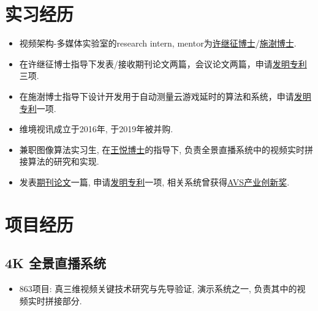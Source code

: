 \documentclass{resume}
\begin{document}
\section{实习经历}
\begin{itemize}
   \item 视频架构-多媒体实验室的research intern, mentor为\href{https://scholar.google.com/citations?user=x4iWZ7wAAAAJ&hl=en}{许继征博士}/\href{https://scholar.google.com/citations?hl=en&user=RQD_dqYAAAAJ}{施澍博士}.
  \item 在许继征博士指导下发表/接收期刊论文两篇，会议论文两篇，申请\href{http://www.soopat.com/Home/Result?Sort=&View=&Columns=&Valid=&Embed=&Db=&Ids=&FolderIds=&FolderId=&ImportPatentIndex=&Filter=&SearchWord=%E9%BB%8E%E5%90%89%E5%9B%BD&FMZL=Y&SYXX=Y&WGZL=Y&FMSQ=Y}{发明专利}三项.
  \item 在施澍博士指导下设计开发用于自动测量云游戏延时的算法和系统，申请\href{http://www.soopat.com/Patent/202110172567}{发明专利}一项.
\end{itemize}

\begin{itemize}
  \item 维境视讯成立于2016年, 于2019年被并购.
  \item 兼职图像算法实习生, 在\href{https://dblp.uni-trier.de/pid/33/4822-32.html}{王悦博士}的指导下, 负责全景直播系统中的视频实时拼接算法的研究和实现.
  \item 发表\href{https://kns.cnki.net/kcms/detail/detail.aspx?dbcode=CJFD&dbname=CJFDLAST2018&filename=PZKX201803003&v=tPaKZsLxkg0cUv5TgA0vLc%25mmd2B%25mmd2FYm0D6CGdqsd20qB21aAFkQVtxA1pTOQHC3je4lKJ}{期刊论文}一篇, 申请\href{http://www.soopat.com/Patent/201711100069}{发明专利}一项, 相关系统曾获得\href{http://www.avs.org.cn/avs_award/2017.asp}{AVS产业创新奖}.
\end{itemize}

\section{项目经历}
\subsection{4K 全景直播系统}
\begin{itemize}
  \item 863项目: 真三维视频关键技术研究与先导验证, 演示系统之一, 负责其中的视频实时拼接部分.
\end{itemize}
\end{document}
